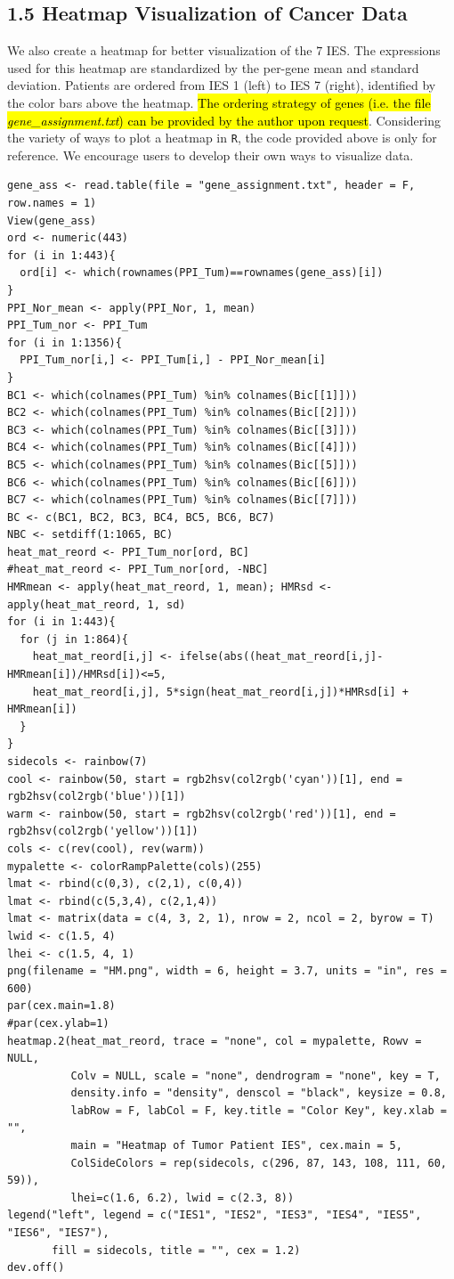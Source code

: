 \documentclass[a4paper, 11pt]{article}
\begin{document}
\subsection*{1.5 Heatmap Visualization of Cancer Data}
We also create a heatmap for better visualization of the $7$ IES. The expressions used for this heatmap are standardized by the per-gene mean and standard deviation. Patients are ordered from IES 1 (left) to IES 7 (right), identified by the color bars above the heatmap. \hl{The ordering strategy of genes (i.e. the file \textit{gene\_assignment.txt}) can be provided by the author upon request}. Considering the variety of ways to plot a heatmap in \texttt{R}, the code provided above is only for reference. We encourage users to develop their own ways to visualize data.
\begin{lstlisting}
gene_ass <- read.table(file = "gene_assignment.txt", header = F, row.names = 1)
View(gene_ass)
ord <- numeric(443)
for (i in 1:443){
  ord[i] <- which(rownames(PPI_Tum)==rownames(gene_ass)[i])
}
PPI_Nor_mean <- apply(PPI_Nor, 1, mean)
PPI_Tum_nor <- PPI_Tum
for (i in 1:1356){
  PPI_Tum_nor[i,] <- PPI_Tum[i,] - PPI_Nor_mean[i]
}
BC1 <- which(colnames(PPI_Tum) %in% colnames(Bic[[1]]))
BC2 <- which(colnames(PPI_Tum) %in% colnames(Bic[[2]]))
BC3 <- which(colnames(PPI_Tum) %in% colnames(Bic[[3]]))
BC4 <- which(colnames(PPI_Tum) %in% colnames(Bic[[4]]))
BC5 <- which(colnames(PPI_Tum) %in% colnames(Bic[[5]]))
BC6 <- which(colnames(PPI_Tum) %in% colnames(Bic[[6]]))
BC7 <- which(colnames(PPI_Tum) %in% colnames(Bic[[7]]))
BC <- c(BC1, BC2, BC3, BC4, BC5, BC6, BC7)
NBC <- setdiff(1:1065, BC)
heat_mat_reord <- PPI_Tum_nor[ord, BC]
#heat_mat_reord <- PPI_Tum_nor[ord, -NBC]
HMRmean <- apply(heat_mat_reord, 1, mean); HMRsd <- apply(heat_mat_reord, 1, sd)
for (i in 1:443){
  for (j in 1:864){
    heat_mat_reord[i,j] <- ifelse(abs((heat_mat_reord[i,j]-HMRmean[i])/HMRsd[i])<=5,
    heat_mat_reord[i,j], 5*sign(heat_mat_reord[i,j])*HMRsd[i] + HMRmean[i])
  }
}
sidecols <- rainbow(7)
cool <- rainbow(50, start = rgb2hsv(col2rgb('cyan'))[1], end = rgb2hsv(col2rgb('blue'))[1])
warm <- rainbow(50, start = rgb2hsv(col2rgb('red'))[1], end = rgb2hsv(col2rgb('yellow'))[1])
cols <- c(rev(cool), rev(warm))
mypalette <- colorRampPalette(cols)(255)
lmat <- rbind(c(0,3), c(2,1), c(0,4))
lmat <- rbind(c(5,3,4), c(2,1,4))
lmat <- matrix(data = c(4, 3, 2, 1), nrow = 2, ncol = 2, byrow = T)
lwid <- c(1.5, 4)
lhei <- c(1.5, 4, 1)
png(filename = "HM.png", width = 6, height = 3.7, units = "in", res = 600)
par(cex.main=1.8)
#par(cex.ylab=1)
heatmap.2(heat_mat_reord, trace = "none", col = mypalette, Rowv = NULL, 
          Colv = NULL, scale = "none", dendrogram = "none", key = T, 
          density.info = "density", denscol = "black", keysize = 0.8, 
          labRow = F, labCol = F, key.title = "Color Key", key.xlab = "", 
          main = "Heatmap of Tumor Patient IES", cex.main = 5, 
          ColSideColors = rep(sidecols, c(296, 87, 143, 108, 111, 60, 59)), 
          lhei=c(1.6, 6.2), lwid = c(2.3, 8))
legend("left", legend = c("IES1", "IES2", "IES3", "IES4", "IES5", "IES6", "IES7"), 
       fill = sidecols, title = "", cex = 1.2)
dev.off()
\end{lstlisting}
\end{document}
